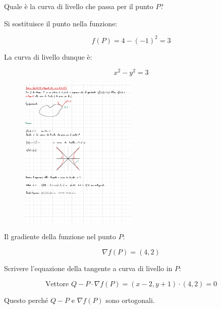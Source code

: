 \documentclass[a4paper]{article}
\begin{document}
	\noindent
	Quale è la curva di livello che passa per il punto $P$?\newline
	
	\noindent
	Si sostituisce il punto nella funzione:
	
	\begin{equation*}
		f\left(P\right) = 4 - \left(-1\right)^{2} = 3
	\end{equation*}

	\noindent
	La curva di livello dunque è:
	
	\begin{equation*}
		x^{2} - y^{2} = 3
	\end{equation*}

	\begin{figure}[!htp]
		\centering
		\includegraphics[width=0.5\textwidth]{img/teorema_gradiente_ortogonale_ex1.pdf}
	\end{figure}

	\newpage

	\noindent
	Il gradiente della funzione nel punto $P$:
	
	\begin{equation*}
		\nabla f\left(P\right) = \left(4,2\right)
	\end{equation*}

	\noindent
	Scrivere l'equazione della tangente a curva di livello in $P$:
	
	\begin{equation*}
		\text{Vettore } Q - P \cdot \nabla f\left(P\right) = \left(x-2, y+1\right) \cdot \left(4,2\right) = 0
	\end{equation*}

	\noindent
	Questo perché $Q-P$ e $\nabla f\left(P\right)$ sono ortogonali.\newline
	
\end{document}
